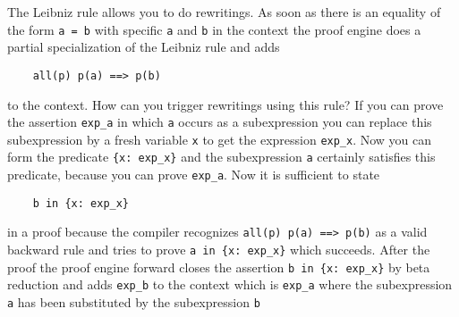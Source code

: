 The Leibniz rule allows you to do rewritings. As soon as there is an equality
of the form \lstinline!a = b! with specific \lstinline!a! and \lstinline!b! in
the context the proof engine does a partial specialization of the Leibniz rule
and adds
%
\begin{lstlisting}
    all(p) p(a) ==> p(b)
\end{lstlisting}
%
to the context. How can you trigger rewritings using this rule? If you can
prove the assertion \lstinline!exp_a! in which \lstinline!a! occurs as a
subexpression you can replace this subexpression by a fresh variable
\lstinline!x! to get the expression \lstinline!exp_x!. Now you can form the
predicate \lstinline!{x: exp_x}! and the subexpression \lstinline!a!
certainly satisfies this predicate, because you can prove
\lstinline!exp_a!. Now it is sufficient to state
%
\begin{lstlisting}
    b in {x: exp_x}
\end{lstlisting}
%
in a proof because the compiler recognizes \lstinline!all(p) p(a) ==> p(b)! as
a valid backward rule and tries to prove \lstinline!a in {x: exp_x}! which
succeeds. After the proof the proof engine forward closes the assertion
\lstinline!b in {x: exp_x}! by beta reduction and adds \lstinline!exp_b! to
the context which is \lstinline!exp_a! where the subexpression \lstinline!a!
has been substituted by the subexpression \lstinline!b!

